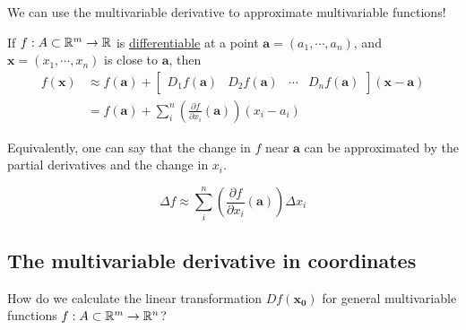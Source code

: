  We can use the multivariable derivative to approximate multivariable functions!

 \begin{theorem}
    
    If $f : A \subset \mathbb{R}^m \to \mathbb{R}$ is \underline{differentiable} at a point $\bm{a} = (a_1, \cdots, a_n)$, and $\bm{x}= (x_1, \cdots, x_n)$ is close to $\bm{a}$, then 
    \begin{align*}
     f(\bm{x}) &\approx f(\bm{a}) + \begin{bmatrix}
D_1f(\bm{a}) & D_2f(\bm{a}) & \cdots & D_nf(\bm{a})
\end{bmatrix} (\bm{x} - \bm{a}) \\
    &= f(\bm{a}) + \sum_{i}^n \left(\frac{\partial f}{\partial x_i}(\bm{a})\right)(x_i - a_i)   
    \end{align*}
    
    \end{theorem}

Equivalently, one can say that the change in $f$ near $\bm{a}$ can be approximated by the partial derivatives and the change in $x_i$.
    
    
    $$\Delta f \approx \sum_{i}^n \left(\frac{\partial f}{\partial x_i}(\bm{a})\right)\Delta x_i$$

\subsection{The multivariable derivative in coordinates}

\begin{motivating}
    How do we calculate the linear transformation $Df(\bm{x_0})$ for general multivariable functions $f : A \subset \mathbb{R}^m \to \mathbb{R}^n$?
    \end{motivating}


